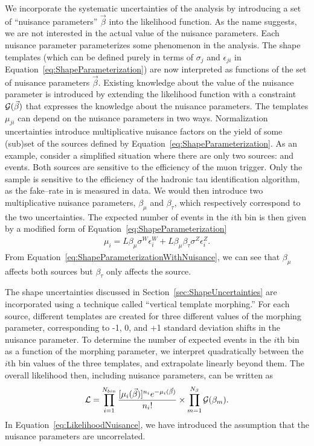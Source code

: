 We incorporate the systematic uncertainties of the analysis  by introducing a
set of ``nuisance parameters'' $\vec \beta$ into the likelihood function.  As
the name suggests, we are not interested in the actual value of the nuisance
parameters.  Each nuisance parameter parameterizes some phenomenon in the
analysis.  The shape templates (which can be defined purely in terms of
$\sigma_j$ and $\epsilon_{ji}$ in Equation~\ref{eq:ShapeParameterization}) are
now interpreted as functions of the set of nuisance parameters $\vec \beta$.
Existing knowledge about the value of the nuisance parameter is introduced by
extending the likelihood function with a constraint ${\cal G}(\vec \beta)$ 
that expresses the knowledge about the nuisance parameters. 
The templates $\mu_{ji}$ can depend on the nuisance parameters in two ways.
Normalization uncertainties introduce multiplicative nuisance factors on the
yield of some (sub)set of the sources defined by
Equation~\ref{eq:ShapeParameterization}.  As an example, consider a simplified
situation where there are only two sources: \ZTT and \WpJets events.  Both 
sources are sensitive to the efficiency of the muon trigger.  Only the \ZTT
sample is sensitive to the efficiency of the hadronic tau identification
algorithm, as the fake--rate in \WpJets is measured in data.  We would then
introduce two multiplicative nuisance parameters, $\beta_\mu$ and $\beta_\tau$,
which respectively correspond to the two uncertainties.  The expected number of
events in the \mbox{$i$th} bin is then given by a modified form of
Equation~\ref{eq:ShapeParameterization}
\begin{eqnarray}
  \mu_i = L \beta_\mu \sigma^W \epsilon^W_{i} 
  + L \beta_\mu \beta_\tau  \sigma^Z \epsilon^Z_i.
  \label{eq:ShapeParameterizationWithNuisance}
\end{eqnarray}
From Equation~\ref{eq:ShapeParameterizationWithNuisance}, we can see that
$\beta_\mu$ affects both sources but $\beta_\tau$ only
affects the \ZTT source.

The shape uncertainties discussed in Section~\ref{sec:ShapeUncertainties} are
incorporated using a technique called ``vertical template morphing.''  For each
source, different templates are created for three different values of the
morphing parameter, corresponding to -1, 0, and +1 standard deviation shifts in
the nuisance parameter. To determine the number of expected events in the $i$th
bin as a function of the morphing parameter, we interpret quadratically between
the $i$th bin values of the three templates, and extrapolate linearly beyond
them.
The overall likelihood then, including nuisance parameters, can be written as
\begin{equation}
  {\cal L} = \prod_{i=1}^{N_{bin}} 
  \frac{[\mu_i(\vec \beta)]^{n_i} e^{-\mu_i(\vec \beta)}}{n_i!} 
  \times \prod_{m=1}^{N_\beta}{\cal G}(\beta_m).
  \label{eq:LikelihoodNuisance}
\end{equation}
In Equation~\ref{eq:LikelihoodNuisance}, we have introduced the assumption that
the nuisance parameters are uncorrelated.  

